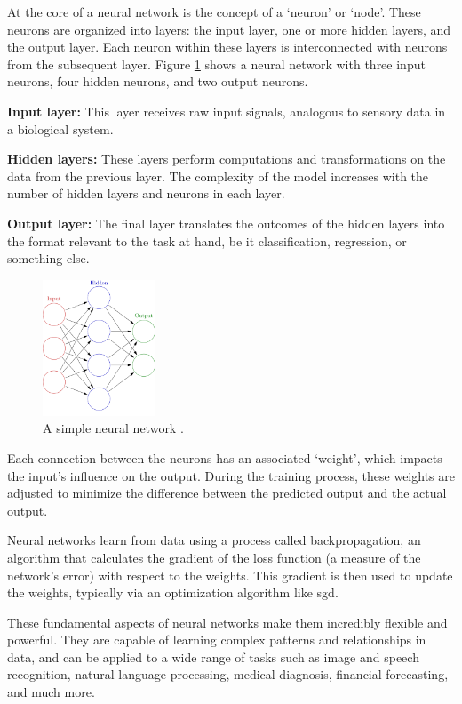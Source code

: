At the core of a neural network is the concept of a `neuron' or `node'. These
neurons are organized into layers: the input layer, one or more hidden layers,
and the output layer. Each neuron within these layers is interconnected with
neurons from the subsequent layer. Figure \ref{fig:nn} shows a neural network
with three input neurons, four hidden neurons, and two output neurons.

\textbf{Input layer:} This layer receives raw input signals,
analogous to sensory data in a biological system.

\textbf{Hidden layers:} These layers perform computations and transformations
on the data from the previous layer. The complexity of the model increases with
the number of hidden layers and neurons in each layer.

\textbf{Output layer:} The final layer translates the outcomes of the hidden
layers into the format relevant to the task at hand, be it classification,
regression, or something else.

\begin{figure}
	\centering
	\includegraphics[width=0.3\textwidth]{files/nn.png}
	\caption{A simple neural network \citep{glosserca}.}
	\label{fig:nn}
\end{figure}

Each connection between the neurons has an associated `weight', which impacts
the input's influence on the output. During the training process, these weights
are adjusted to minimize the difference between the predicted output and the
actual output.

Neural networks learn from data using a process called backpropagation, an
algorithm that calculates the gradient of the loss function (a measure of the
network's error) with respect to the weights. This gradient is then used to
update the weights, typically via an optimization algorithm like \gls{sgd}.

These fundamental aspects of neural networks make them incredibly flexible and
powerful. They are capable of learning complex patterns and relationships in
data, and can be applied to a wide range of tasks such as image and speech
recognition, natural language processing, medical diagnosis, financial
forecasting, and much more.

